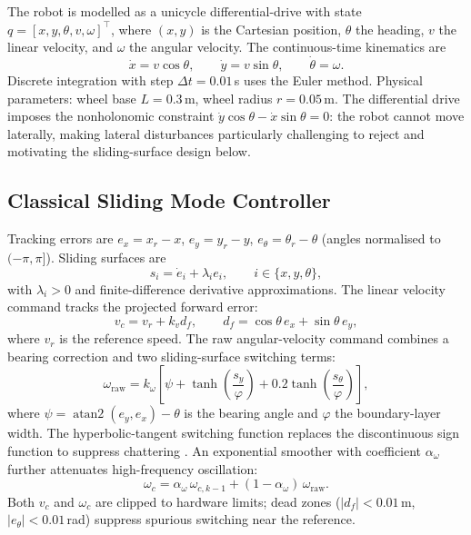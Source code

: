 \documentclass[11pt,a4paper]{article}
\begin{document}
The robot is modelled as a unicycle differential-drive with state
$q = [x, y, \theta, v, \omega]^{\top}$, where $(x, y)$ is the Cartesian position,
$\theta$ the heading, $v$ the linear velocity, and $\omega$ the angular velocity.
The continuous-time kinematics are
\begin{equation}
    \dot{x} = v\cos\theta, \qquad \dot{y} = v\sin\theta, \qquad \dot{\theta} = \omega .
    \label{eq:kinematics}
\end{equation}
Discrete integration with step $\Delta t = 0.01$\,s uses the Euler method. Physical
parameters: wheel base $L = 0.3$\,m, wheel radius $r = 0.05$\,m. The differential drive
imposes the nonholonomic constraint $\dot{y}\cos\theta - \dot{x}\sin\theta = 0$: the
robot cannot move laterally, making lateral disturbances particularly challenging to
reject and motivating the sliding-surface design below.

\subsection{Classical Sliding Mode Controller}

Tracking errors are $e_x = x_r - x$, $e_y = y_r - y$, $e_\theta = \theta_r - \theta$
(angles normalised to $(-\pi, \pi]$). Sliding surfaces are
\begin{equation}
    s_i = \dot{e}_i + \lambda_i e_i, \qquad i \in \{x, y, \theta\},
    \label{eq:surfaces}
\end{equation}
with $\lambda_i > 0$ and finite-difference derivative approximations.
The linear velocity command tracks the projected forward error:
\begin{equation}
    v_c = v_r + k_v d_f, \qquad d_f = \cos\theta\, e_x + \sin\theta\, e_y ,
    \label{eq:vc}
\end{equation}
where $v_r$ is the reference speed. The raw angular-velocity command combines a bearing
correction and two sliding-surface switching terms:
\begin{equation}
    \omega_{\text{raw}} = k_\omega \left[ \psi
        + \tanh\!\left(\frac{s_y}{\varphi}\right)
        + 0.2\tanh\!\left(\frac{s_\theta}{\varphi}\right) \right],
    \label{eq:omega}
\end{equation}
where $\psi = \operatorname{atan2}(e_y, e_x) - \theta$ is the bearing angle and $\varphi$
the boundary-layer width. The hyperbolic-tangent switching function replaces the
discontinuous sign function to suppress chattering \cite{shtessel2014}. An exponential
smoother with coefficient $\alpha_\omega$ further attenuates high-frequency oscillation:
\begin{equation}
    \omega_c = \alpha_\omega\, \omega_{c,k-1} + (1 - \alpha_\omega)\, \omega_{\text{raw}} .
    \label{eq:smoother}
\end{equation}
Both $v_c$ and $\omega_c$ are clipped to hardware limits; dead zones
($|d_f| < 0.01$\,m, $|e_\theta| < 0.01$\,rad) suppress spurious switching near the
reference.
\end{document}

